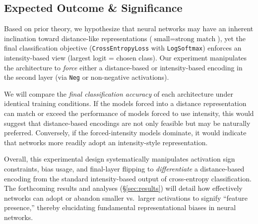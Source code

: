 \subsection{Expected Outcome \& Significance}
\label{sec:expected_outcomes}
Based on prior theory, we hypothesize that neural networks may have an inherent inclination toward distance-like representations (\( \text{small} = \text{strong match} \)), yet the final classification objective (\texttt{CrossEntropyLoss} with \texttt{LogSoftmax}) enforces an intensity-based view (largest logit = chosen class). Our experiment manipulates the architecture to \emph{force} either a distance-based or intensity-based encoding in the second layer (via \texttt{Neg} or non-negative activations). 

We will compare the \emph{final classification accuracy} of each architecture under identical training conditions. If the models forced into a distance representation can match or exceed the performance of models forced to use intensity, this would suggest that distance-based encodings are not only feasible but may be naturally preferred. Conversely, if the forced-intensity models dominate, it would indicate that networks more readily adopt an intensity-style representation. 

Overall, this experimental design systematically manipulates activation sign constraints, bias usage, and final-layer flipping to \emph{differentiate} a distance-based encoding from the standard intensity-based output of cross-entropy classification. The forthcoming results and analyses (\S\ref{sec:results}) will detail how effectively networks can adopt or abandon smaller vs.\ larger activations to signify “feature presence,” thereby elucidating fundamental representational biases in neural networks.
